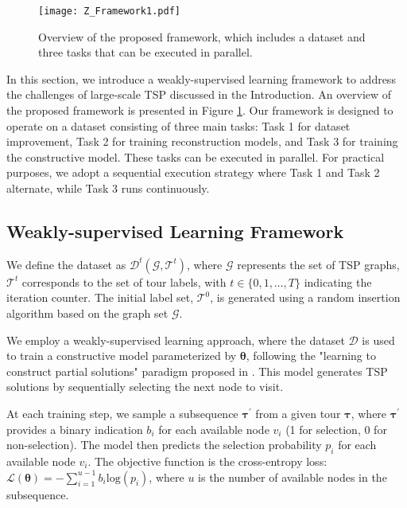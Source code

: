 \begin{figure}[t]
\centering
\texttt{[image: Z\_Framework1.pdf]}
\caption{Overview of the proposed framework, which includes a dataset and three tasks that can be executed in parallel. 
}
\label{fig:Framework}
\end{figure}

In this section, we introduce a weakly-supervised learning framework to address the challenges of large-scale TSP discussed in the Introduction. An overview of the proposed framework is presented in Figure \ref{fig:Framework}. Our framework is designed to operate on a dataset consisting of three main tasks: 
Task 1 for dataset improvement, Task 2 for training reconstruction models, and Task 3 for training the constructive model. 
These tasks can be executed in parallel. For practical purposes, we adopt a sequential execution strategy where Task 1 and Task 2 alternate, while Task 3 runs continuously. 

\subsection{Weakly-supervised Learning Framework}
We define the dataset as $\mathcal{D}^t(\boldsymbol{\mathcal{G}}, \boldsymbol{\mathcal{T}}^t)$, where 
$\boldsymbol{\mathcal{G}}$ 
represents the set of TSP graphs, 
$\boldsymbol{\mathcal{T}}^t$ 
corresponds to the set of tour labels, with  $t \in \{0,1,\dots,T\}$ indicating the iteration counter. 
The initial label set, $\boldsymbol{\mathcal{T}}^0$, is generated using a random insertion algorithm based on the graph set $\boldsymbol{\mathcal{G}}$.

We employ a weakly-supervised learning approach, where the dataset $\mathcal{D}$ is used to train a constructive model parameterized by $\boldsymbol{\theta}$, following the "learning to construct partial solutions" paradigm proposed in \citet{luo2023neural}.
This model generates TSP solutions by sequentially selecting the next node to visit. 

At each training step, we sample a subsequence $\boldsymbol{\tau}^{\prime}$ from a given tour $\boldsymbol{\tau}$, where $\boldsymbol{\tau}^\prime$ provides a binary indication $b_i$ for each available node $v_i$ (1 for selection, 0 for non-selection). 
The model then predicts the selection probability $p_i$ for each available node $v_i$. 
The objective function is the cross-entropy loss:
${\mathcal{L}(\boldsymbol{\theta}) = -\sum_{i=1}^{u-1}{b_i\text{log}(p_i)}}$,
where $u$ is the number of available nodes in the subsequence. 

